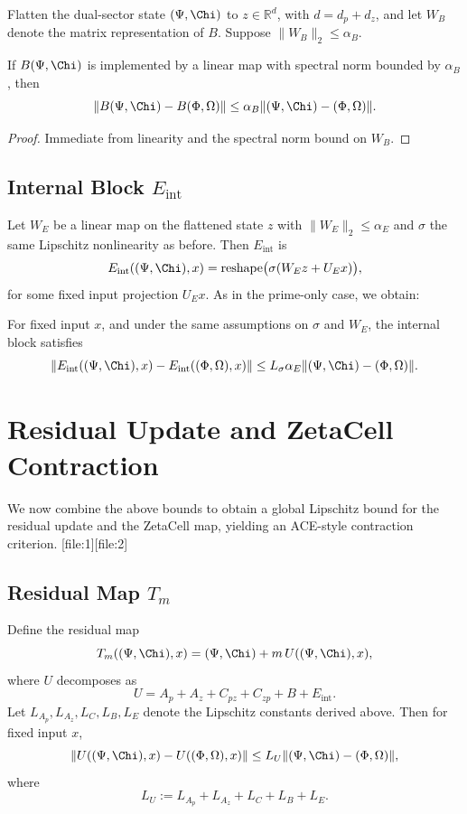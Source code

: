 \documentclass[11pt]{article}
\begin{document}
Flatten the dual-sector state $(\Psi,\Chi)$ to $z \in \mathbb{R}^{d}$,
with $d = d_p + d_z$, and let $W_B$ denote the matrix representation of
$B$. Suppose $\|W_B\|_2 \le \alpha_B$.

\begin{lemma}
If $B(\Psi,\Chi)$ is implemented by a linear map with spectral norm
bounded by $\alpha_B$, then
\[
  \|B(\Psi,\Chi) - B(\Phi,\Omega)\|
  \le \alpha_B \|(\Psi,\Chi) - (\Phi,\Omega)\|.
\]
\end{lemma}

\begin{proof}
Immediate from linearity and the spectral norm bound on $W_B$.
\end{proof}

\subsection{Internal Block $E_{\mathrm{int}}$}

Let $W_E$ be a linear map on the flattened state $z$ with
$\|W_E\|_2 \le \alpha_E$ and $\sigma$ the same Lipschitz nonlinearity as
before. Then $E_{\mathrm{int}}$ is
\[
  E_{\mathrm{int}}((\Psi,\Chi),x)
  = \mathrm{reshape}\bigl(\sigma(W_E z + U_E x)\bigr),
\]
for some fixed input projection $U_E x$. As in the prime-only case,
we obtain:

\begin{lemma}
For fixed input $x$, and under the same assumptions on $\sigma$ and
$W_E$, the internal block satisfies
\[
  \|E_{\mathrm{int}}((\Psi,\Chi),x) -
    E_{\mathrm{int}}((\Phi,\Omega),x)\|
  \le L_\sigma \alpha_E \|(\Psi,\Chi) - (\Phi,\Omega)\|.
\]
\end{lemma}

\section{Residual Update and ZetaCell Contraction}

We now combine the above bounds to obtain a global Lipschitz bound for
the residual update and the ZetaCell map, yielding an ACE-style
contraction criterion.%
[file:1][file:2]

\subsection{Residual Map $T_m$}

Define the residual map
\[
  T_m((\Psi,\Chi), x) = (\Psi,\Chi) + m\, U((\Psi,\Chi),x),
\]
where $U$ decomposes as
\[
  U = A_p + A_z + C_{pz} + C_{zp} + B + E_{\mathrm{int}}.
\]
Let $L_{A_p}, L_{A_z}, L_C, L_B, L_E$ denote the Lipschitz constants derived
above. Then for fixed input $x$,
\[
  \|U((\Psi,\Chi),x) - U((\Phi,\Omega),x)\|
  \le L_U \|(\Psi,\Chi) - (\Phi,\Omega)\|,
\]
where
\[
  L_U := L_{A_p} + L_{A_z} + L_C + L_B + L_E.
\]
\end{document}
